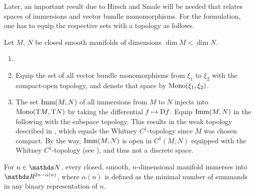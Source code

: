 Later, an important result due to Hirsch and Smale will be needed that
relates spaces of immersions and vector bundle monomorphisms.
For the formulation, one has to equip the respective sets with a
topology as follows.
\begin{Def}
  Let $M$, $N$ be closed smooth manifolds of dimensions $\dim M < \dim N$.
  \begin{enumerate}
  \item %
  \item
    Equip the set of all vector bundle monomorphisms from $\xi_1$ to
    $\xi_2$ with the compact-open topology, and denote that space by
    $\mathrm{Mono}({\xi_1},{\xi_2})$.
  \item %
    The set $\mathrm{Imm}({M},{N})$ of all immersions from $M$ to $N$ injects
    into $\mathrm{Mono}({\mathrm{T}M},{\mathrm{T}N})$ by taking the differential
    $f\mapsto\mathrm{D} f$.
    Equip $\mathrm{Imm}({M},{N})$ in the following with the subspace topology.
    This results in the weak topology described in
    \cite[Section~2.1]{hirsch}, which equals the Whitney
    $C^1$-topology since $M$ was chosen compact.
    By the way, $\mathrm{Imm}({M},{N})$ is open in $C^1(M,N)$ equipped with the
    Whitney $C^1$-topology
    (see \cite[Section~2.1, Theorem~1.1]{hirsch}),
    and thus not a discrete space.
  \end{enumerate}
\end{Def}


\begin{Thm}\label{thm:immersionconj}
  For $n\in\Nat$, every closed, smooth, $n$-dimensional manifold
  immerses into $\R^{2n-\alpha(n)}$, where $\alpha(n)$ is defined as
  the minimal number of summands in any binary representation of $n$.
\end{Thm}

\begin{Rem} %
  
\end{Rem}

